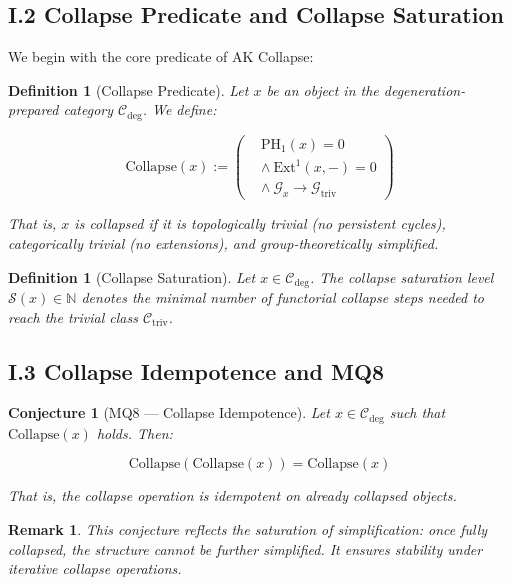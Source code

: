 \documentclass[11pt]{article}
\newtheorem{definition}[theorem]{Definition}
\newtheorem{remark}[theorem]{Remark}
\newtheorem{conjecture}{Conjecture}[section]
\begin{document}
\subsection*{I.2 Collapse Predicate and Collapse Saturation}

We begin with the core predicate of AK Collapse:

\begin{definition}[Collapse Predicate]
Let $x$ be an object in the degeneration-prepared category $\mathcal{C}_{\mathrm{deg}}$. We define:

\[
\mathrm{Collapse}(x) := \left(
\begin{aligned}
& \mathrm{PH}_1(x) = 0 \\
& \wedge \ \mathrm{Ext}^1(x, -) = 0 \\
& \wedge \ \mathcal{G}_x \to \mathcal{G}_{\mathrm{triv}}
\end{aligned}
\right)
\]

That is, $x$ is collapsed if it is topologically trivial (no persistent cycles), categorically trivial (no extensions), and group-theoretically simplified.
\end{definition}

\begin{definition}[Collapse Saturation]
Let $x \in \mathcal{C}_{\mathrm{deg}}$. The collapse saturation level $\mathcal{S}(x) \in \mathbb{N}$ denotes the minimal number of functorial collapse steps needed to reach the trivial class $\mathcal{C}_{\mathrm{triv}}$.
\end{definition}

\subsection*{I.3 Collapse Idempotence and MQ8}

\begin{conjecture}[MQ8 — Collapse Idempotence]
Let $x \in \mathcal{C}_{\mathrm{deg}}$ such that $\mathrm{Collapse}(x)$ holds. Then:

\[
\mathrm{Collapse}(\mathrm{Collapse}(x)) = \mathrm{Collapse}(x)
\]

That is, the collapse operation is idempotent on already collapsed objects.
\end{conjecture}

\begin{remark}
This conjecture reflects the saturation of simplification: once fully collapsed, the structure cannot be further simplified. It ensures stability under iterative collapse operations.
\end{remark}
\end{document}
